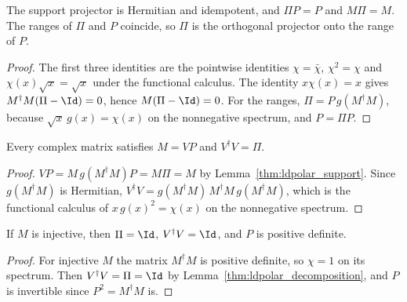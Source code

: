 \begin{lemma}
    \label{thm:ldpolar_support}
    \leanok
    The support projector is Hermitian and idempotent, and
    $\Pi P=P$ and $M\Pi=M$. The ranges of $\Pi$ and $P$ coincide, so $\Pi$
    is the orthogonal projector onto the range of $P$.
\end{lemma}
\begin{proof}
    \leanok
    The first three identities are the pointwise identities $\chi=\bar\chi$,
    $\chi^2=\chi$ and $\chi(x)\sqrt x=\sqrt x$ under the functional
    calculus. The identity $x\chi(x)=x$ gives $M^\dagger M(\Pi-\Id)=0$,
    hence $M(\Pi-\Id)=0$. For the ranges, $\Pi=P\,g(M^\dagger M)$, because
    $\sqrt x\,g(x)=\chi(x)$ on the nonnegative spectrum, and $P=\Pi P$.
\end{proof}

\begin{lemma}
    \label{thm:ldpolar_decomposition}
    \leanok
    Every complex matrix satisfies $M=VP$ and $V^\dagger V=\Pi$.
\end{lemma}
\begin{proof}
    \leanok
    $VP=M\,g(M^\dagger M)P=M\Pi=M$ by Lemma~\ref{thm:ldpolar_support}.
    Since $g(M^\dagger M)$ is Hermitian,
    $V^\dagger V=g(M^\dagger M)\,M^\dagger M\,g(M^\dagger M)$, which is the
    functional calculus of $x\,g(x)^2=\chi(x)$ on the nonnegative spectrum.
\end{proof}

\begin{lemma}
    \label{thm:ldpolar_injective}
    \leanok
    If $M$ is injective, then $\Pi=\Id$, $V^\dagger V=\Id$, and $P$ is
    positive definite.
\end{lemma}
\begin{proof}
    \leanok
    For injective $M$ the matrix $M^\dagger M$ is positive definite, so
    $\chi=1$ on its spectrum. Then $V^\dagger V=\Pi=\Id$ by
    Lemma~\ref{thm:ldpolar_decomposition}, and $P$ is invertible since
    $P^2=M^\dagger M$ is.
\end{proof}

